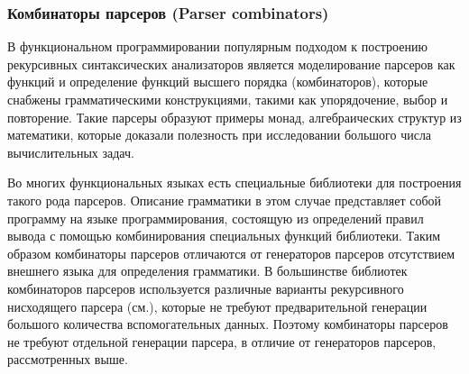 \documentclass[a4paper,12pt,titlepage]{extarticle}
\begin{document}
\subsubsection*{Комбинаторы парсеров (Parser combinators)}
В функциональном программировании популярным подходом к построению рекурсивных
синтаксических анализаторов является моделирование парсеров как функций и
определение функций высшего порядка (комбинаторов), которые снабжены
грамматическими конструкциями, такими как упорядочение, выбор и повторение.
Такие парсеры образуют примеры монад, алгебраических структур из математики,
которые доказали полезность при исследовании большого числа вычислительных
задач. 

Во многих функциональных языках есть специальные библиотеки для построения
такого рода парсеров. Описание грамматики в этом случае представляет собой
программу на языке программирования, состоящую из определений правил вывода с
помощью комбинирования специальных функций библиотеки. 
Таким образом комбинаторы парсеров отличаются от генераторов парсеров 
отсутствием внешнего языка для определения грамматики.
В большинстве библиотек комбинаторов парсеров используется различные варианты
рекурсивного нисходящего парсера (см.\cite{recdescp}), которые не требуют
предварительной генерации большого количества вспомогательных данных. Поэтому
комбинаторы парсеров не требуют отдельной генерации парсера, в отличие от
генераторов парсеров, рассмотренных выше.
\end{document}
